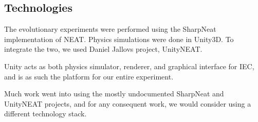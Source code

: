 \subsection{Technologies}
The evolutionary experiments were performed using the
SharpNeat\cite{web:sharpneat} implementation of NEAT. Physics simulations were
done in Unity3D\cite{web:unity}. To integrate the two, we used Daniel Jallovs
project, UnityNEAT\cite{web:unityneat}.

Unity acts as both physics simulator, renderer, and graphical interface for IEC,
and is as such the platform for our entire experiment.

Much work went into using the mostly undocumented SharpNeat and UnityNEAT
projects, and for any consequent work, we would consider using a different
technology stack.

